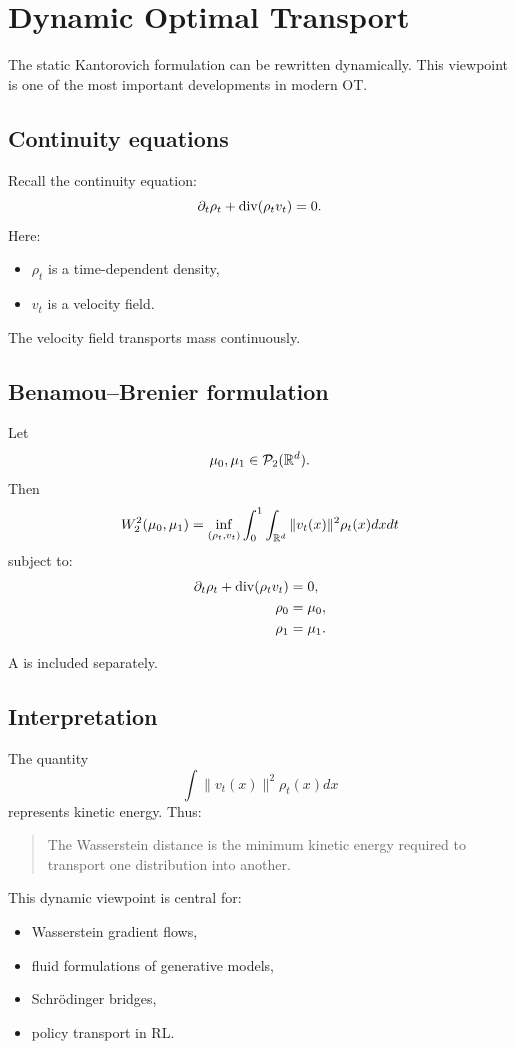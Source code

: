 \section{Dynamic Optimal Transport}
The static Kantorovich formulation can be rewritten dynamically.
This viewpoint is one of the most important developments in modern OT.
\subsection{Continuity equations}
Recall the continuity equation:
\[
\partial_t \rho_t
+
\operatorname{div}(\rho_t v_t)=0.
\]
Here:
\begin{itemize}
    \item $\rho_t$ is a time-dependent density,
    \item $v_t$ is a velocity field.
\end{itemize}
The velocity field transports mass continuously.
\subsection{Benamou--Brenier formulation}
\begin{theorem}
Let
\[
\mu_0,\mu_1 \in \mathcal{P}_2(\mathbb{R}^d).
\]
Then
\[
W_2^2(\mu_0,\mu_1)
=
\inf_{(\rho_t,v_t)}
\int_0^1
\int_{\mathbb{R}^d}
 \|v_t(x)\|^2\rho_t(x)dxdt
\]
subject to:
\begin{align*}
\partial_t \rho_t
+
\operatorname{div}(\rho_t v_t)&=0,
\\
\rho_0 &= \mu_0,
\\
\rho_1 &= \mu_1.
\end{align*}
\end{theorem}
A 
is included separately.
\subsection{Interpretation}
The quantity
\[
\int \|v_t(x)\|^2\rho_t(x)dx
\]
represents kinetic energy.
Thus:
\begin{quote}
The Wasserstein distance is the minimum kinetic energy required to transport one distribution into another.
\end{quote}
This dynamic viewpoint is central for:
\begin{itemize}
    \item Wasserstein gradient flows,
    \item fluid formulations of generative models,
    \item Schr\"odinger bridges,
    \item policy transport in RL.
\end{itemize}

